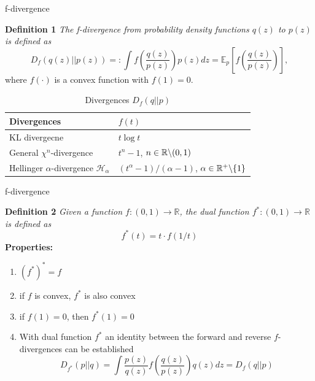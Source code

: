 \documentclass{beamer}
\begin{document}
\begin{frame}{f-divergence}
    \begin{block}{}
        \textbf{Definition 1} \textit{The f-divergence from probability density functions $q(z)$ to $p(z)$ is defined as}
        \begin{equation}\label{def1}
            D_f(q(z)||p(z)) =: \int f\left(\dfrac{q(z)}{p(z)}\right)p(z) dz = \mathbb{E}_p\left[f\left(\dfrac{q(z)}{p(z)}\right)\right],
        \end{equation}
        where $f(\cdot)$ is a convex function with $f(1)=0$.

        \begin{table}[]
        \caption{Divergences $D_f(q||p)$}
        \begin{tabular}{|l|l|}
        \hline
        Divergences                                        & $f(t)$                              \\ \hline
        KL divergecne                                      & $t\log t$                           \\ \hline
        General $\chi^n$-divergence                           & $t^n - 1$, $n\in \mathbb{R}\symbol{92}(0, 1)$ \\ \hline
        Hellinger $\alpha$-divergence $\mathcal{H_\alpha}$ &   $(t^\alpha - 1) \slash (\alpha - 1)$, $\alpha\in\mathbb{R}^+\symbol{92}\{1\}$                                  \\ \hline
        \end{tabular}
        \end{table}
    \end{block}
\end{frame}

\begin{frame}{f-divergence}
    \begin{block}{}
        \textbf{Definition 2} \textit{Given a function $f: (0,1) \rightarrow \mathbb{R}$, the dual function $f^*: (0,1)\rightarrow \mathbb{R}$ is defined as}
        \begin{equation*}
            f^*(t) = t \cdot f(1\slash t)
        \end{equation*}
        \textbf{Properties:}
        \begin{enumerate}
            \item $(f^*)^* = f$
            \item if $f$ is convex, $f^*$ is also convex
            \item if $f(1)=0$, then $f^*(1)=0$
            \item With dual function $f^*$ an identity between the forward and reverse $f$-divergences can be established 
            $$D_{f^*}(p||q) = \int \dfrac{p(z)}{q(z)}f\left(\dfrac{q(z)}{p(z)}\right)q(z) dz = D_f(q||p)$$
        \end{enumerate}
    \end{block}
\end{frame}
\end{document}
